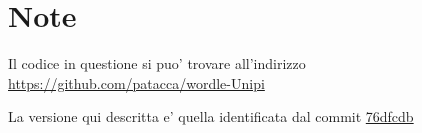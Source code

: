 \section{Note}

Il codice in questione si puo' trovare all'indirizzo \url{https://github.com/patacca/wordle-Unipi}

La versione qui descritta e' quella identificata dal commit \href{https://github.com/patacca/wordle-Unipi/commit/76dfcdb8798e3f12413e4e70b7cbb0adfb90e272}{76dfcdb}